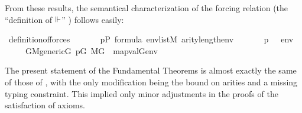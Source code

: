%
From these results, the semantical characterization of the forcing
relation (the ``definition of $\Vdash$''
\cite[IV.2.22]{kunen2011set}) follows easily:
\begin{isabelle}
\isamarkupfalse%
\ definition{\isacharunderscore}of{\isacharunderscore}forces{\isacharcolon}\isanewline
\ \ \isanewline
\ \ \ \ {\isachardoublequoteopen}p{\isasymin}P{\isachardoublequoteclose}\ {\isachardoublequoteopen}{\isasymphi}{\isasymin}formula{\isachardoublequoteclose}\ {\isachardoublequoteopen}env{\isasymin}list{\isacharparenleft}M{\isacharparenright}{\isachardoublequoteclose}\ {\isachardoublequoteopen}arity{\isacharparenleft}{\isasymphi}{\isacharparenright}{\isasymle}length{\isacharparenleft}env{\isacharparenright}{\isachardoublequoteclose}\isanewline
\ \ \isanewline
\ \ \ \ {\isachardoublequoteopen}{\isacharparenleft}p\ {\isasymtturnstile}\ {\isasymphi}\ env{\isacharparenright}\ {\isasymlongleftrightarrow}\isanewline
\ \ \ \ \ {\isacharparenleft}{\isasymforall}G{\isachardot}{\isacharparenleft}M{\isacharunderscore}generic{\isacharparenleft}G{\isacharparenright}{\isasymand}\ p{\isasymin}G{\isacharparenright}{\isasymlongrightarrow}\ M{\isacharbrackleft}G{\isacharbrackright}\ {\isacharcomma}\ map{\isacharparenleft}val{\isacharparenleft}G{\isacharparenright}{\isacharcomma}env{\isacharparenright}\ {\isasymTurnstile}\ {\isasymphi}{\isacharparenright}{\isachardoublequoteclose}
\end{isabelle}

The present statement of the Fundamental Theorems is almost exactly
the same of those of \cite{2019arXiv190103313G}, with the only
modification being the bound on arities and a missing typing
constraint. This implied only minor adjustments in the proofs of the
satisfaction of axioms.

